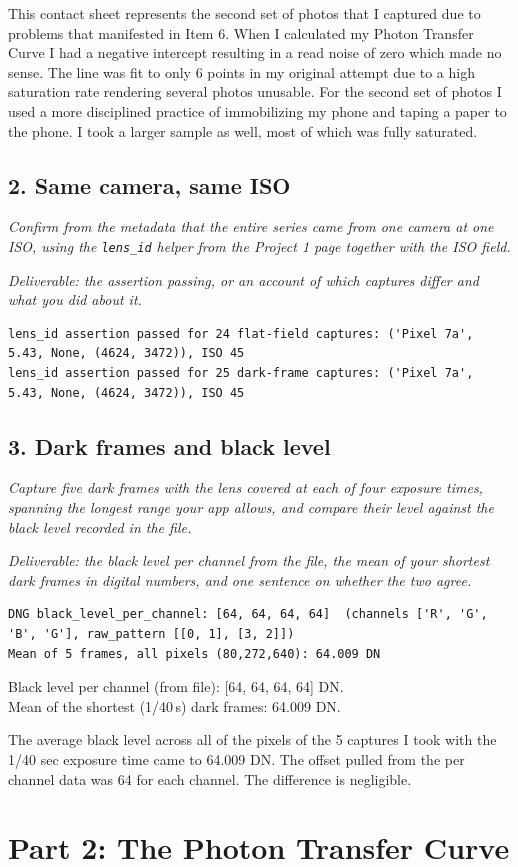 \documentclass[11pt]{article}
\newcommand{\task}[3]{\subsection*{#1}{\sloppy\noindent\textit{#2}\par}\smallskip\noindent\textit{Deliverable: #3}\par\medskip}
\begin{document}
This contact sheet represents the second set of photos that I captured due to problems that manifested in Item 6.
When I calculated my Photon Transfer Curve I had a negative intercept resulting in a read noise of zero which made no sense.
The line was fit to only 6 points in my original attempt due to a high saturation rate rendering several photos unusable.
For the second set of photos I used a more disciplined practice of immobilizing my phone and taping a paper to the phone.
I took a larger sample as well, most of which was fully saturated.

\task{2. Same camera, same ISO}
{Confirm from the metadata that the entire series came from one camera at one ISO, using the \texttt{lens\_id} helper from the Project 1 page together with the ISO field.}
{the assertion passing, or an account of which captures differ and what you did about it.}

\begin{lstlisting}
lens_id assertion passed for 24 flat-field captures: ('Pixel 7a', 5.43, None, (4624, 3472)), ISO 45
lens_id assertion passed for 25 dark-frame captures: ('Pixel 7a', 5.43, None, (4624, 3472)), ISO 45
\end{lstlisting}

\task{3. Dark frames and black level}
{Capture five dark frames with the lens covered at each of four exposure times, spanning the longest range your app allows, and compare their level against the black level recorded in the file.}
{the black level per channel from the file, the mean of your shortest dark frames in digital numbers, and one sentence on whether the two agree.}

\begin{lstlisting}
DNG black_level_per_channel: [64, 64, 64, 64]  (channels ['R', 'G', 'B', 'G'], raw_pattern [[0, 1], [3, 2]])
Mean of 5 frames, all pixels (80,272,640): 64.009 DN
\end{lstlisting}

\noindent Black level per channel (from file): [64, 64, 64, 64] DN.\\
Mean of the shortest (1/40\,s) dark frames: 64.009 DN.

The average black level across all of the pixels of the 5 captures I took with the 1/40 sec exposure time
came to 64.009 DN. The offset pulled from the per channel data was 64 for each channel.
The difference is negligible. 

\section*{Part 2: The Photon Transfer Curve}
\end{document}

